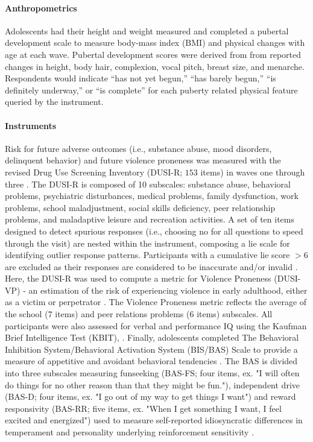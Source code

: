 \documentclass[utf8]{frontiersSCNS} %
\begin{document}
\paragraph{Anthropometrics} Adolescents had their height and weight measured and completed a pubertal development scale \citep{carskadon1993self} to measure body-mass index (BMI) and physical changes with age at each wave. Pubertal development scores were derived from from reported changes in height, body hair, complexion, vocal pitch, breast size, and menarche. Respondents would indicate “has not yet begun,” “has barely begun,” “is definitely underway,” or “is complete” for each puberty related physical feature queried by the instrument. 
\paragraph{Instruments} Risk for future adverse outcomes (i.e., substance abuse, mood disorders, delinquent behavior) and future violence proneness was measured with the revised Drug Use Screening Inventory (DUSI-R; $153$ items) in waves one through three \citep{tarter1994reliability}. The DUSI-R is composed of 10 subscales: substance abuse, behavioral problems, psychiatric disturbances, medical problems, family dysfunction, work problems, school maladjustment, social skills deficiency, peer relationship problems, and maladaptive leisure and recreation activities. A set of ten items designed to detect spurious responses (i.e., choosing no for all questions to speed through the visit) are nested within the instrument, composing a lie scale for identifying outlier response patterns. Participants with a cumulative lie score $>6$ are excluded as their responses are considered to be inaccurate and/or invalid \citep{dalla2003effects}. Here, the DUSI-R was used to compute a metric for Violence Proneness (DUSI-VP) - an estimation of the risk of experiencing violence in early adulthood, either as a victim or perpetrator \citep{kirisci2009violence}. The Violence Proneness metric reflects the average of the school ($7$ items) and peer relations problems ($6$ items) subscales. All participants were also assessed for verbal and performance IQ using the Kaufman Brief Intelligence Test (KBIT), \citep{kaufman2004kaufman}. Finally, adolescents completed The Behavioral Inhibition System/Behavioral Activation System (BIS/BAS) Scale  to provide a measure of appetitive and avoidant behavioral tendencies \citep{carver1994behavioral}. The BAS is divided into three subscales measuring funseeking (BAS-FS; four items, ex. "I will often do things for no other reason than that they might be fun."), independent drive (BAS-D; four items, ex. "I go out of my way to get things I want") and reward responsivity (BAS-RR; five items, ex. "When I get something I want, I feel excited and energized") used to measure self-reported idiosyncratic differences in temperament and personality underlying reinforcement sensitivity \citep{corr2004reinforcementsensitivity}.
\end{document}
